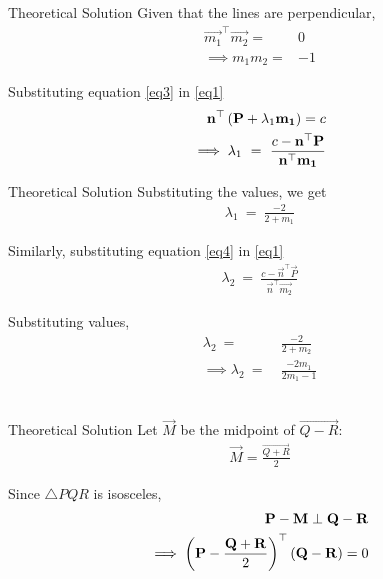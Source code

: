 \documentclass{beamer}
\begin{document}
\begin{frame}{Theoretical Solution}
Given that the lines are perpendicular, 
\begin{align}
    \vec{m_1}^\top\vec{m_2} =& 0\\
    \implies m_1m_2 =& -1
\end{align}

Substituting equation \eqref{eq3} in \eqref{eq1}
\begin{align}
    \vec{n}^\top\brak{\vec{P} + \lambda_1\vec{m_1}} = c\\
    \implies \lambda_1 \ = \ \frac{c-\vec{n}^\top\vec{P}}{\vec{n}^\top\vec{m_1}}
\end{align}

\end{frame}

\begin{frame}{Theoretical Solution}
Substituting the values, we get
\begin{align}
    \lambda_1 \ = \ \frac{-2}{2+m_1} \label{eq9}
\end{align}

Similarly, substituting equation \eqref{eq4} in \eqref{eq1}
\begin{align}
    \lambda_2 \ = \ \frac{c-\vec{n}^\top\vec{P}}{\vec{n}^\top\vec{m_2}}
\end{align}

Substituting values,
\begin{align}
    \lambda_2 \ =&\ \frac{-2}{2+m_2}\\
    \implies \lambda_2 \ =& \ \frac{-2m_1}{2m_1-1} \label{eq12}
\end{align}\\
\end{frame}

\begin{frame}{Theoretical Solution}
Let $\vec{M}$ be the midpoint of $\vec{Q-R}$:
\begin{align}
    \vec{M} = \frac{\vec{Q+R}}{2}
\end{align}

Since $\triangle PQR$ is isosceles,
\begin{align}
    \mathbf{P}-\mathbf{M} \perp \mathbf{Q}-\mathbf{R}\\
    \implies \left(\mathbf{P}-\frac{\mathbf{Q+R}}{2}\right)^\top \left(\mathbf{Q}-\mathbf{R}\right) = 0
\end{align}\\
\end{frame}
\end{document}
